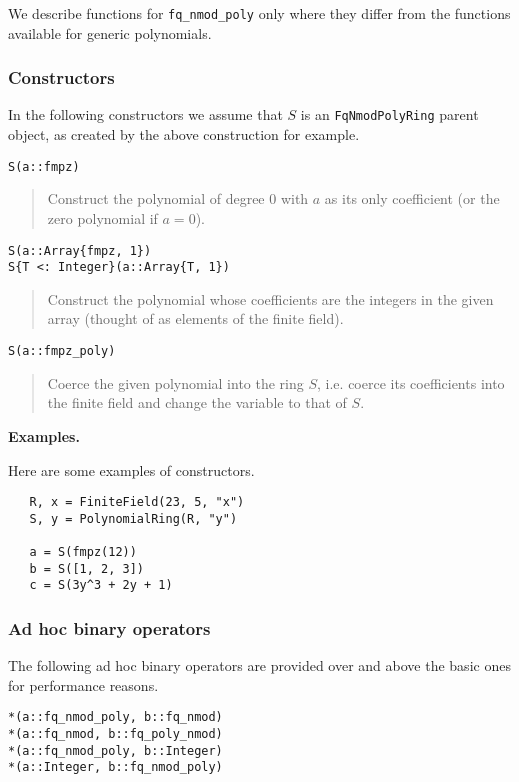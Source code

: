 \documentclass[a4paper,10pt]{article}
\newcommand{\code}{\lstinline}
\newcommand{\desc}[1]{\vspace{-3mm}\begin{quote}#1\end{quote}}
\begin{document}
{{We describe functions for \code{fq_nmod_poly} only where they differ from the functions
available for generic polynomials.

\subsubsection{Constructors}

In the following constructors we assume that $S$ is an \code{FqNmodPolyRing} parent 
object, as created by the above construction for example.

\begin{lstlisting}
S(a::fmpz)
\end{lstlisting}

\desc{Construct the polynomial of degree $0$ with $a$ as its only coefficient (or
the zero polynomial if $a = 0$).}

\begin{lstlisting}
S(a::Array{fmpz, 1})
S{T <: Integer}(a::Array{T, 1})
\end{lstlisting}

\desc{Construct the polynomial whose coefficients are the integers in the given
array (thought of as elements of the finite field).}

\begin{lstlisting}
S(a::fmpz_poly)
\end{lstlisting}

\desc{Coerce the given polynomial into the ring $S$, i.e. coerce its coefficients
into the finite field and change the variable to that of $S$.}

\textbf{Examples.}

Here are some examples of constructors.

\begin{lstlisting}
   R, x = FiniteField(23, 5, "x")
   S, y = PolynomialRing(R, "y")

   a = S(fmpz(12))
   b = S([1, 2, 3])
   c = S(3y^3 + 2y + 1)
\end{lstlisting}

\subsubsection{Ad hoc binary operators}

The following ad hoc binary operators are provided over and above the basic ones
for performance reasons.

\begin{lstlisting}
*(a::fq_nmod_poly, b::fq_nmod)
*(a::fq_nmod, b::fq_poly_nmod)
*(a::fq_nmod_poly, b::Integer)
*(a::Integer, b::fq_nmod_poly)
\end{lstlisting}

}}
\end{document}
